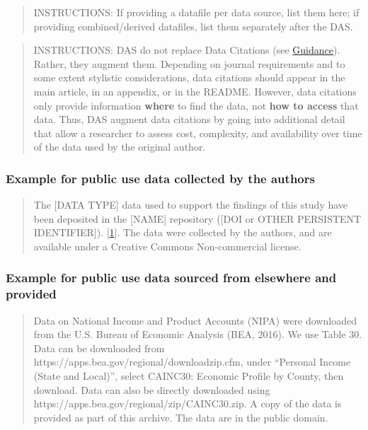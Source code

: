 \documentclass[
]{article}
\begin{document}
\begin{quote}
INSTRUCTIONS: If providing a datafile per data source, list them here;
if providing combined/derived datafiles, list them separately after the
DAS.
\end{quote}

\begin{quote}
INSTRUCTIONS: DAS do not replace Data Citations (see
\href{https://social-science-data-editors.github.io/template_README/Data_citation_guidance.html}{Guidance}).
Rather, they augment them. Depending on journal requirements and to some
extent stylistic considerations, data citations should appear in the
main article, in an appendix, or in the README. However, data citations
only provide information \textbf{where} to find the data, not
\textbf{how to access} that data. Thus, DAS augment data citations by
going into additional detail that allow a researcher to assess cost,
complexity, and availability over time of the data used by the original
author.
\end{quote}

\hypertarget{example-for-public-use-data-collected-by-the-authors}{%
\subsubsection{Example for public use data collected by the
authors}\label{example-for-public-use-data-collected-by-the-authors}}

\begin{quote}
The {[}DATA TYPE{]} data used to support the findings of this study have
been deposited in the {[}NAME{]} repository ({[}DOI or OTHER PERSISTENT
IDENTIFIER{]}).
{[}\href{https://www.hindawi.com/research.data/\#statement.templates}{1}{]}.
The data were collected by the authors, and are available under a
Creative Commons Non-commercial license.
\end{quote}

\hypertarget{example-for-public-use-data-sourced-from-elsewhere-and-provided}{%
\subsubsection{Example for public use data sourced from elsewhere and
provided}\label{example-for-public-use-data-sourced-from-elsewhere-and-provided}}

\begin{quote}
Data on National Income and Product Accounts (NIPA) were downloaded from
the U.S. Bureau of Economic Analysis (BEA, 2016). We use Table 30. Data
can be downloaded from https://apps.bea.gov/regional/downloadzip.cfm,
under ``Personal Income (State and Local)'', select CAINC30: Economic
Profile by County, then download. Data can also be directly downloaded
using https://apps.bea.gov/regional/zip/CAINC30.zip. A copy of the data
is provided as part of this archive. The data are in the public domain.
\end{quote}
\end{document}
